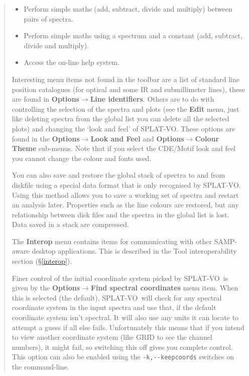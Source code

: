 \documentclass[twoside,11pt]{article}
\newcommand{\htmladdimg}[1]{}
\newcommand{\htmlref}[2]{#1}
\newcommand{\latex}[1]{#1}
\newcommand{\latexhtml}[2]{#1}
\renewcommand{\_}{\texttt{\symbol{95}}}
\newcommand{\SPLAT}{\textsf{SPLAT-VO}}
\newcommand{\inline}[1]
        {\latexhtml{\texttt{[image: sun243\_figures/\#1]}}
        {\htmladdimg[align=center]{#1.gif}}}
\newcommand{\menuitem}[1]{\textbf{#1}}
\newcommand{\submenuitem}[2]{\latexhtml{\textbf{#1$\rightarrow$#2}}{\textbf{#1->#2}}}
\begin{document}
\begin{quote}
\begin{itemize}
  \item[\inline{binarymath}] Perform simple maths (add, subtract, divide
  and multiply) between pairs of spectra.

  \item[\inline{unarymaths}] Perform simple maths using a spectrum and a
  constant (add, subtract, divide and multiply).

  \item[\inline{help}] Access the on-line help system.

\end{itemize}

 Interesting menu items not found in the toolbar are a list of standard line
 position catalogues (for optical and some IR and submillimeter lines), these
 are found in \submenuitem{Options}{Line identifiers}.  Others are to do with
 controlling the selection of the spectra and plots (see the \menuitem{Edit}
 menu, just like deleting spectra from the global list you can delete all the
 selected plots) and changing the `look and feel' of \SPLAT. These options are
 found in the \submenuitem{Options}{Look and Feel} and
 \submenuitem{Options}{Colour Theme} sub-menus. Note that if you select the
 CDE/Motif look and feel you cannot change the colour and fonts used.

 You can also save and restore the global stack of spectra to and from
 diskfile using a special data format that is only recognised by \SPLAT.
 Using this method allows you to save a working set of spectra and restart an
 analysis later. Properties such as the line colours are restored, but any
 relationship between disk files and the spectra in the global list is
 lost. Data saved in a stack are compressed.

 The \menuitem{Interop} menu contains items for communicating with other
 SAMP-aware desktop applications. This is described in the
 \htmlref{Tool interoperability}{interop} section
 \latex{(\S\ref{interop})}.

 Finer control of the initial coordinate system picked by \SPLAT\ is given by
 the \submenuitem{Options}{Find spectral coordinates} menu item.  When this is
 selected (the default), \SPLAT\ will check for any spectral coordinate system
 in the input spectra and use that, if the default coordinate system isn't
 spectral. It will also use any units it can locate to attempt a guess if all
 else fails. Unfortunately this means that if you intend to view another
 coordinate system (like GRID to see the channel numbers), it might fail, so
 switching this off gives you complete control. This option can also be
 enabled using the \verb+-k,--keepcoords+ switches on the command-line.

\end{quote}
\end{document}

